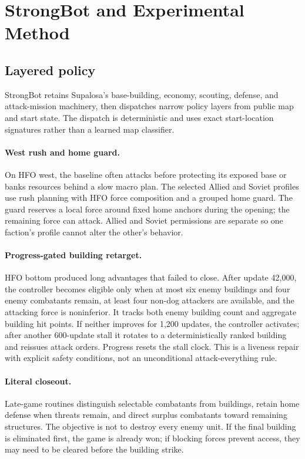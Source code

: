 \section{StrongBot and Experimental Method}
\label{sec:method}

\subsection{Layered policy}

StrongBot retains Supalosa's base-building, economy, scouting, defense, and
attack-mission machinery, then dispatches narrow policy layers from public map
and start state. The dispatch is deterministic and uses exact start-location
signatures rather than a learned map classifier.

\paragraph{West rush and home guard.}
On HFO west, the baseline often attacks before protecting its exposed base or
banks resources behind a slow macro plan. The selected Allied and Soviet
profiles use rush planning with HFO force composition and a grouped home guard.
The guard reserves a local force around fixed home anchors during the opening;
the remaining force can attack. Allied and Soviet permissions are separate so
one faction's profile cannot alter the other's behavior.

\paragraph{Progress-gated building retarget.}
HFO bottom produced long advantages that failed to close. After update 42,000,
the controller becomes eligible only when at most six enemy buildings and four
enemy combatants remain, at least four non-dog attackers are available, and
the attacking force is noninferior. It tracks both enemy building count and
aggregate building hit points. If neither improves for 1,200 updates, the
controller activates; after another 600-update stall it rotates to a
deterministically ranked building and reissues attack orders. Progress resets
the stall clock. This is a liveness repair with explicit safety conditions, not
an unconditional attack-everything rule.

\paragraph{Literal closeout.}
Late-game routines distinguish selectable combatants from buildings, retain
home defense when threats remain, and direct surplus combatants toward
remaining structures. The objective is not to destroy every enemy unit. If
the final building is eliminated first, the game is already won; if blocking
forces prevent access, they may need to be cleared before the building strike.

